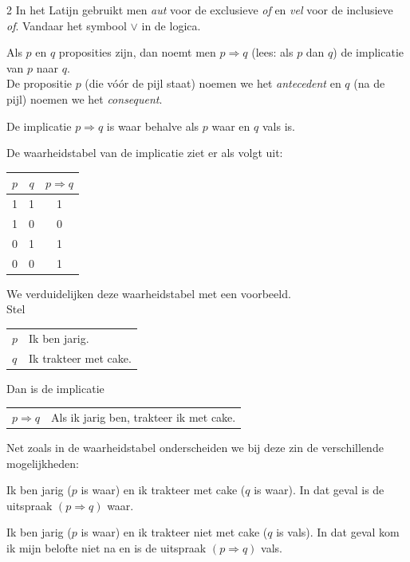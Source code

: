 \begin{multicols}{2}
In het Latijn gebruikt men \emph{aut} voor de exclusieve \emph{of} en \emph{vel} voor de inclusieve \emph{of}. Vandaar het symbool $\lor$ in de logica.



Als $p$ en $q$ proposities zijn, dan noemt men $p \Rightarrow q$ (lees: als $p$ dan $q$) de implicatie van $p$ naar $q$.\\

De propositie $p$ (die v\'{o}\'{o}r de pijl staat) noemen we het \emph{antecedent} en $q$ (na de pijl) noemen we het \emph{consequent}.

De implicatie $p\Rightarrow q$ is waar behalve als $p$ waar en $q$ vals is.

De waarheidstabel van de implicatie ziet er als volgt uit:
\begin{center}
\begin{tabular}{c|c|c}  
$p$ & $q$ & $p\Rightarrow q$\\
\hline
1 & 1 & 1 \\
1 & 0 & 0\\
0 & 1 & 1\\
0 & 0 & 1
\end{tabular}
\end{center}


We verduidelijken deze waarheidstabel met een voorbeeld.\\ 

Stel \\
\begin{tabular}{ll}
$p$    &  Ik ben jarig.\\
$q$   &  Ik trakteer met cake.
\end{tabular}

Dan is de implicatie \\
\begin{tabular}{ll}
$p \Rightarrow q$     &  Als ik jarig ben, trakteer ik met cake.\\
 \end{tabular}


Net zoals in de waarheidstabel onderscheiden we bij deze zin de verschillende mogelijkheden:
\begin{opsomming}

\item  Ik ben jarig ($p$ is waar) en ik trakteer met cake ($q$ is waar). In dat geval is de uitspraak $(p\Rightarrow q)$ waar.
\item Ik ben jarig ($p$ is waar) en ik trakteer niet met cake ($q$ is vals). In dat geval kom ik mijn belofte niet na en is de uitspraak $(p\Rightarrow q)$ vals. 


\end{opsomming}
\end{multicols}
